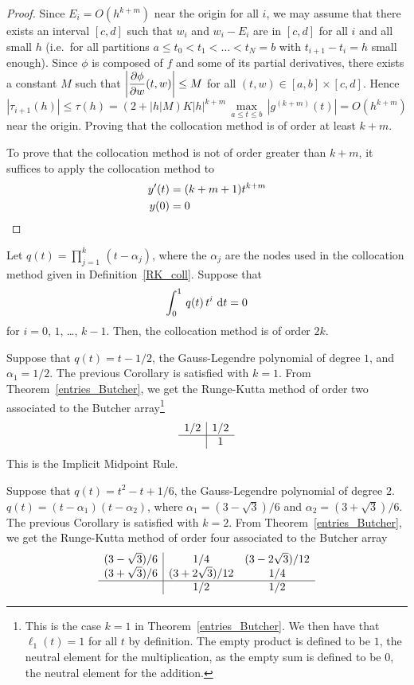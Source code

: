 \begin{proof}
Since $E_i = O(h^{k+m})$ near the origin for all $i$, we may assume that there
exists an interval $[c,d]$ such that $w_i$ and $w_i-E_i$ are in $[c,d]$
for all $i$ and all small $h$ (i.e.\ for all partitions
$a \leq t_0 < t_1 < \dots < t_N = b$ with $t_{i+1}-t_i=h$ small
enough).  Since $\phi$ is composed of $f$ and some of its partial
derivatives, there exists a constant $M$ such that
$\left|\displaystyle \frac{\partial{\phi}}{\partial{w}}(t,w)\right| \leq M$ for all
$(t,w) \in [a,b]\times [c,d]$.
Hence
\[
|\tau_{i+1}(h)| \leq \tau(h) = \left( 2 + |h| M\right) K
|h|^{k+m}\,\max_{a\leq t \leq b}\, \left| g^{(k+m)}(t) \right| 
= O(h^{k+m})
\]
near the origin.  Proving that the collocation method is of
order at least $k+m$.

To prove that the collocation method is not of order greater than
$k+m$, it suffices to apply the collocation method to
\begin{align*}
y'(t) &= (k+m+1)t^{k+m} \\
y(0) &= 0  \qedhere
\end{align*}
\end{proof}

\begin{cor}
Let $\displaystyle q(t) = \prod_{j=1}^k\,(t-\alpha_j)$, where the
$\alpha_j$ are the nodes used in the collocation method given in
Definition~\ref{RK_coll}.  Suppose that
\[ 
\int_0^1 \, q(t)\,t^i\,\,\mathrm{d}t = 0
\]
for $i=0$, $1$, \ldots, $k-1$.  Then, the collocation method is of
order $2k$.
\label{best_IRK}
\end{cor}

\begin{egg}
Suppose that $q(t) = t- 1/2$, the Gauss-Legendre polynomial of degree
$1$, and $\alpha_1 = 1/2$.  The previous Corollary is satisfied with
$k=1$.   From Theorem~\ref{entries_Butcher}, we get the Runge-Kutta
method of order two associated to the Butcher array\footnote{This is
the case $k=1$ in Theorem~\ref{entries_Butcher}.  We then have that
$\ell_1(t) = 1$ for all $t$ by definition.  The empty product is
defined to be $1$, the neutral element for the multiplication, as the
empty sum is defined to be $0$, the neutral element for the addition.}
\[
\begin{array}{c|c}
1/2 & 1/2 \\
\hline
 & 1
\end{array}
\]
This is the Implicit Midpoint Rule.

Suppose that $q(t) = t^2 -t + 1/6$, the Gauss-Legendre polynomial of
degree $2$.  $q(t) = (t-\alpha_1)(t-\alpha_2)$, where
$\alpha_1 = (3- \sqrt{3})/6$ and $\alpha_2 = (3 + \sqrt{3})/6$.  The
previous Corollary is satisfied with $k=2$.  From
Theorem~\ref{entries_Butcher}, we get the Runge-Kutta method of
order four associated to the Butcher array
\[
\begin{array}{c|cc}
(3-\sqrt{3})/6 & 1/4 & (3-2 \sqrt{3})/12 \\
(3+\sqrt{3})/6 & (3 + 2 \sqrt{3})/12 & 1/4 \\
\hline
 & 1/2 & 1/2
\end{array}
\]
\label{Gauss_Leg_RK}
\end{egg}

